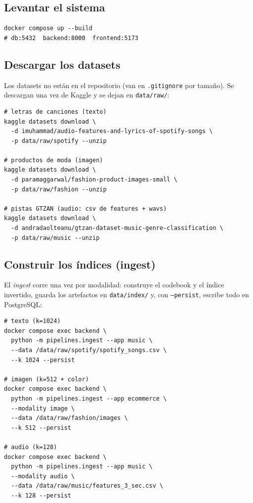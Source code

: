 \documentclass[conference]{IEEEtran}
\begin{document}
\subsection{Levantar el sistema}
\begin{lstlisting}
docker compose up --build
# db:5432  backend:8000  frontend:5173
\end{lstlisting}

\subsection{Descargar los datasets}
Los datasets no están en el repositorio (van en \texttt{.gitignore} por
tamaño). Se descargan una vez de Kaggle y se dejan en \texttt{data/raw/}:

\begin{lstlisting}
# letras de canciones (texto)
kaggle datasets download \
  -d imuhammad/audio-features-and-lyrics-of-spotify-songs \
  -p data/raw/spotify --unzip

# productos de moda (imagen)
kaggle datasets download \
  -d paramaggarwal/fashion-product-images-small \
  -p data/raw/fashion --unzip

# pistas GTZAN (audio: csv de features + wavs)
kaggle datasets download \
  -d andradaolteanu/gtzan-dataset-music-genre-classification \
  -p data/raw/music --unzip
\end{lstlisting}

\subsection{Construir los índices (ingest)}
El \textit{ingest} corre una vez por modalidad: construye el codebook y el
índice invertido, guarda los artefactos en \texttt{data/index/} y, con
\texttt{--persist}, escribe todo en PostgreSQL:

\begin{lstlisting}
# texto (k=1024)
docker compose exec backend \
  python -m pipelines.ingest --app music \
  --data /data/raw/spotify/spotify_songs.csv \
  --k 1024 --persist

# imagen (k=512 + color)
docker compose exec backend \
  python -m pipelines.ingest --app ecommerce \
  --modality image \
  --data /data/raw/fashion/images \
  --k 512 --persist

# audio (k=128)
docker compose exec backend \
  python -m pipelines.ingest --app music \
  --modality audio \
  --data /data/raw/music/features_3_sec.csv \
  --k 128 --persist
\end{lstlisting}
\end{document}
